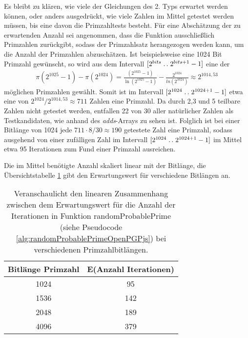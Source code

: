 Es bleibt zu klären, wie viele der Gleichungen des 2. Typs erwartet werden können, oder anders ausgedrückt, wie viele Zahlen im Mittel getestet werden müssen, bis eine davon die Primzahltests besteht. 
Für eine Abschätzung der zu erwartenden Anzahl sei angenommen, dass die Funktion ausschließlich Primzahlen zurückgibt, sodass der Primzahlsatz herangezogen werden kann, um die Anzahl der Primzahlen abzuschätzen.
Ist beispielsweise eine 1024 Bit Primzahl gewünscht, so wird aus dem Intervall $[2^{bits}\mathrel{{.}\,{.}}\nobreak 2^{bits+1}-1]$ eine der \begin{align}
\pi(2^{1025}-1) - \pi(2^{1024}) = \frac{(2^{1025}-1)}{\ln(2^{1025}-1)} - \frac{2^{1024}}{ln(2^{1024})} \approx 2^{1014,53}
\end{align}
möglichen Primzahlen gewählt.
Somit ist im Intervall $[2^{1024}\mathrel{{.}\,{.}}\nobreak 2^{1024+1}-1]$ etwa eine von $2^{1024}/2^{1014,53} \approx 711$ Zahlen eine Primzahl.
Da durch 2,3 und 5 teilbare Zahlen nicht getestet werden, entfallen 22 von 30 aller natürlicher Zahlen als Testkandidaten, wie anhand des \textit{adds}-Arrays zu sehen ist.
Folglich ist bei einer Bitlänge von 1024 jede $711 \cdot 8/30 \approx 190$ getestete Zahl eine Primzahl, sodass ausgehend von einer zufälligen Zahl im Intervall $[2^{1024}\mathrel{{.}\,{.}}\nobreak 2^{1024+1}-1]$ im Mittel etwa 95 Iterationen zum Fund einer Primzahl ausreichen.

Die im Mittel benötigte Anzahl skaliert linear mit der Bitlänge, die Übersichtstabelle \ref{tbl:bitLengthNumberOfIterations} gibt den Erwartungswert für verschiedene Bitlängen an.

\begin{table}[h]
\caption{Veranschaulicht den linearen Zusammenhang zwischen dem Erwartungswert für die Anzahl der Iterationen in Funktion randomProbablePrime (siehe Pseudocode \ref{alg:randomProbablePrimeOpenPGPjs}) bei verschiedenen Primzahlbitlängen.}
\label{tbl:bitLengthNumberOfIterations}
\begin{tabular}{cc}
\toprule
Bitlänge Primzahl          & E(Anzahl Iterationen) \\
\midrule
1024                       & 95                    \\
1536                       & 142                   \\
2048                       & 189                   \\
4096                       & 379                   \\
\bottomrule
\end{tabular}
\end{table}

